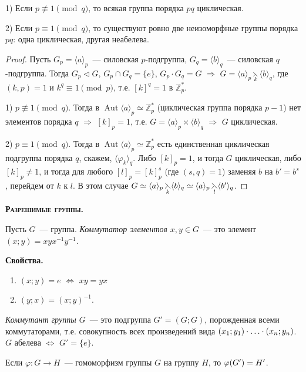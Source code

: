 \documentclass[a4paper]{article}
\newcommand*{\tema}[1]{\vspace{20pt}
\begin{center}{\textbf{\textsc{#1.}}}\vspace{5pt}
\end{center}}
\newcommand{\svoy}{\vspace{5pt}\noindent\textbf{Свойства.}\vspace{-6pt}}
\renewcommand{\Aut}{\mathop{\mathrm{Aut}}\nolimits}
\newcommand*{\p}[1]{#1\nobreak\discretionary{}{\hbox{$\mathsurround=0pt #1$}}{}}
\begin{document}
\begin{theorem}
1) Если $p\not\equiv 1\pmod{q}$, то всякая группа порядка $pq$
циклическая.

2) Если $p\equiv 1\pmod{q}$, то существуют ровно две неизоморфные
группы порядка $pq$: одна циклическая, другая неабелева.
\end{theorem}

\begin{proof}
Пусть $G_p=\langle a\rangle_p$~--- силовская $p$-подгруппа,
$G_q=\langle b\rangle_q$~--- силовская $q$-подгруппа. Тогда
$G_p\triangleleft G$, $G_p\cap G_q=\{e\}$, $G_p\cdot G_q=G$
$\Rightarrow$ $G=\langle
a\rangle_p\mathop{\leftthreetimes}\limits_k\langle b\rangle_q$, где
$(k,p)=1$ и $k^q\equiv1\pmod{p}$, т.е. $[k]^q=1$ в $\mathbb{Z}^*_p$.

1) $p\not\equiv 1\pmod{q}$. Тогда в $\Aut\langle
a\rangle_p\simeq\mathbb{Z}^*_p$ (циклическая группа порядка $p-1$)
нет элементов порядка $q$ $\Rightarrow$ $[k]_p=1$, т.е. $G=\langle
a\rangle_p\times\langle b\rangle_q$ $\Rightarrow$ $G$ циклическая.

2) $p\equiv 1\pmod{q}$. Тогда в $\Aut\langle
a\rangle_p\simeq\mathbb{Z}^*_p$ есть единственная циклическая
подгруппа порядка $q$, скажем, $\langle\varphi_k\rangle_q$. Либо
$[k]_p=1$, и тогда $G$ циклическая, либо $[k]_p\neq 1$, и тогда для
любого $[l]_p=[k]_p^s$ (где $(s,q)=1$) заменяя $b$ на $b'=b^s$,
перейдем от $k$ к $l$. В этом случае  $G\simeq\langle
a\rangle_p\mathop{\leftthreetimes}\limits_k\langle b\rangle_q
\p\simeq\langle a\rangle_p\mathop{\leftthreetimes}\limits_l\langle
b'\rangle_q$.
\end{proof}

\tema{Разрешимые группы}

Пусть $G$~--- группа. \emph{Коммутатор элементов $x,y\in G$}~--- это
элемент $(x;y)=xyx^{-1}y^{-1}$.

\svoy
\begin{enumerate}
  \item $(x;y)=e$ $\Leftrightarrow$ $xy=yx$
  \item $(y;x)=(x;y)^{-1}$.
\end{enumerate}

\emph{Коммутант группы $G$}~--- это подгруппа $G'=(G;G)$,
порожденная всеми коммутаторами, т.е. совокупность всех произведений
вида $(x_1;y_1)\p\cdot\ldots\cdot(x_n;y_n)$. $G$ абелева
$\Leftrightarrow$ $G'=\{e\}$.

Если $\varphi\colon G\to H$~--- гомоморфизм группы $G$ на группу
$H$, то $\varphi(G')\p=H'$.
\end{document}
